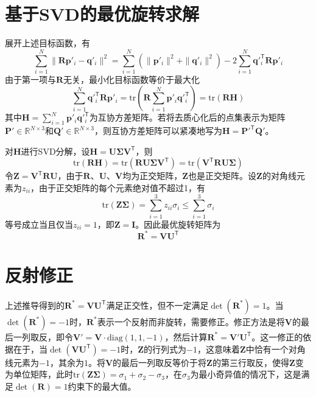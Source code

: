 \documentclass[a4paper,12pt]{ctexrep}
\begin{document}
\section{基于SVD的最优旋转求解}

展开上述目标函数，有
\begin{equation}
    \sum_{i=1}^{N}\|\bm{R}\bm{p}'_i - \bm{q}'_i\|^2 = \sum_{i=1}^{N}(\|\bm{p}'_i\|^2 + \|\bm{q}'_i\|^2) - 2\sum_{i=1}^{N}\bm{q}'^{\mathsf{T}}_i\bm{R}\bm{p}'_i
\end{equation}
由于第一项与$\bm{R}$无关，最小化目标函数等价于最大化
\begin{equation}
    \sum_{i=1}^{N}\bm{q}'^{\mathsf{T}}_i\bm{R}\bm{p}'_i = \mathrm{tr}\left(\bm{R}\sum_{i=1}^{N}\bm{p}'_i\bm{q}'^{\mathsf{T}}_i\right) = \mathrm{tr}(\bm{R}\bm{H})
\end{equation}
其中$\bm{H}=\sum_{i=1}^{N}\bm{p}'_i\bm{q}'^{\mathsf{T}}_i$为互协方差矩阵。若将去质心化后的点集表示为矩阵$\bm{P}'\in\mathbb{R}^{N\times 3}$和$\bm{Q}'\in\mathbb{R}^{N\times 3}$，则互协方差矩阵可以紧凑地写为$\bm{H}=\bm{P}'^{\mathsf{T}}\bm{Q}'$。

对$\bm{H}$进行SVD分解，设$\bm{H}=\bm{U}\bm{\Sigma}\bm{V}^{\mathsf{T}}$，则
\begin{equation}
    \mathrm{tr}(\bm{R}\bm{H}) = \mathrm{tr}(\bm{R}\bm{U}\bm{\Sigma}\bm{V}^{\mathsf{T}}) = \mathrm{tr}(\bm{V}^{\mathsf{T}}\bm{R}\bm{U}\bm{\Sigma})
\end{equation}
令$\bm{Z}=\bm{V}^{\mathsf{T}}\bm{R}\bm{U}$，由于$\bm{R}$、$\bm{U}$、$\bm{V}$均为正交矩阵，$\bm{Z}$也是正交矩阵。设$\bm{Z}$的对角线元素为$z_{ii}$，由于正交矩阵的每个元素绝对值不超过1，有
\begin{equation}
    \mathrm{tr}(\bm{Z}\bm{\Sigma}) = \sum_{i=1}^{3}z_{ii}\sigma_i \leq \sum_{i=1}^{3}\sigma_i
\end{equation}
等号成立当且仅当$z_{ii}=1$，即$\bm{Z}=\bm{I}$。因此最优旋转矩阵为
\begin{equation}
    \bm{R}^* = \bm{V}\bm{U}^{\mathsf{T}}
\end{equation}

\section{反射修正}

上述推导得到的$\bm{R}^*=\bm{V}\bm{U}^{\mathsf{T}}$满足正交性，但不一定满足$\det(\bm{R}^*)=1$。当$\det(\bm{R}^*)=-1$时，$\bm{R}^*$表示一个反射而非旋转，需要修正。修正方法是将$\bm{V}$的最后一列取反，即令$\bm{V}'=\bm{V}\cdot\mathrm{diag}(1,1,-1)$，然后计算$\bm{R}^*=\bm{V}'\bm{U}^{\mathsf{T}}$。这一修正的依据在于，当$\det(\bm{V}\bm{U}^{\mathsf{T}})=-1$时，$\bm{Z}$的行列式为$-1$，这意味着$\bm{Z}$中恰有一个对角线元素为$-1$，其余为$1$。将$\bm{V}$的最后一列取反等价于将$\bm{Z}$的第三行取反，使得$\bm{Z}$变为单位矩阵，此时$\mathrm{tr}(\bm{Z}\bm{\Sigma})=\sigma_1+\sigma_2-\sigma_3$，在$\sigma_3$为最小奇异值的情况下，这是满足$\det(\bm{R})=1$约束下的最大值。
\end{document}
